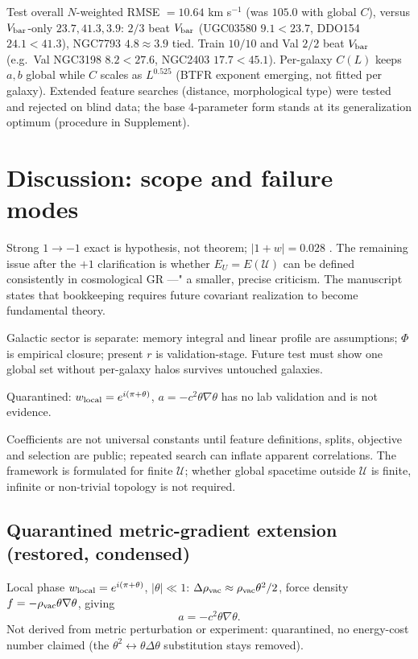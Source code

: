 \documentclass[twocolumn]{aastex631}
\begin{document}
Test overall $N$-weighted RMSE $=10.64$ km s$^{-1}$ (was $105.0$ with global $C$), versus $V_{\rm bar}$-only $23.7,41.3,3.9$: $2/3$ beat $V_{\rm bar}$ (UGC03580 $9.1<23.7$, DDO154 $24.1<41.3$), NGC7793 $4.8\approx3.9$ tied. Train $10/10$ and Val $2/2$ beat $V_{\rm bar}$ (e.g.\ Val NGC3198 $8.2<27.6$, NGC2403 $17.7<45.1$). Per-galaxy $C(L)$ keeps $a,b$ global while $C$ scales as $L^{0.525}$ (BTFR exponent emerging, not fitted per galaxy). Extended feature searches (distance, morphological type) were tested and rejected on blind data; the base 4-parameter form stands at its generalization optimum (procedure in Supplement).

\section{Discussion: scope and failure modes}

Strong $1\to-1$ exact is hypothesis, not theorem; $|1+w|=0.028$ \cite{Planck2020}. The remaining issue after the $+1$ clarification is whether $E_{U}=E(\mathcal U)$ can be defined consistently in cosmological GR ---" a smaller, precise criticism. The manuscript states that bookkeeping requires future covariant realization to become fundamental theory.

Galactic sector is separate: memory integral and linear profile are assumptions; $\Phi$ is empirical closure; present $r$ is validation-stage. Future test must show one global set without per-galaxy halos survives untouched galaxies.

Quarantined: $w_{\rm local}=e^{i(\pi+\theta)}$, $a=-c^{2}\theta\nabla\theta$ has no lab validation and is not evidence.

Coefficients are not universal constants until feature definitions, splits, objective and selection are public; repeated search can inflate apparent correlations. The framework is formulated for finite $\mathcal U$; whether global spacetime outside $\mathcal U$ is finite, infinite or non-trivial topology is not required.

\subsection{Quarantined metric-gradient extension (restored, condensed)}
Local phase $w_{\rm local}=e^{i(\pi+\theta)}$, $|\theta|\ll1$: $\Delta\rho_{\rm vac}\approx\rho_{\rm vac}\theta^2/2$, force density $f=-\rho_{\rm vac}\theta\nabla\theta$, giving
\begin{equation}
\boxed{a=-c^2\theta\nabla\theta}.
\end{equation}
Not derived from metric perturbation or experiment: quarantined, no energy-cost number claimed (the $\theta^2\leftrightarrow\theta\Delta\theta$ substitution stays removed).
\end{document}
